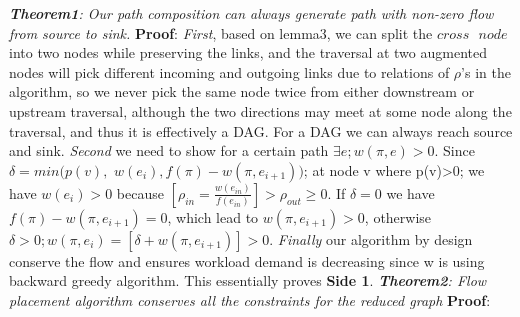 \documentclass{sig-alternate}
\begin{document}
\newline\newline
\textit{\textbf{Theorem1}: Our path composition can always generate path with non-zero flow from source to sink. }
\newline
\textbf{Proof}: 
\newline
\textit{First}, based on lemma3, we can split the $cross\text{ } node$ into two nodes while preserving the links, and the traversal at two augmented nodes will pick different incoming and outgoing links due to relations of $\rho$'s  in the algorithm, so we never pick the same node twice from either downstream or upstream traversal, although the two directions may meet at some node along the traversal, and thus it is effectively a DAG. For a DAG we can always reach source and sink.\newline
\textit{Second} we need to show for a certain path $\exists e; w(\pi, e)>0$. Since $\delta = min( p(v),$ $w(e_{i}),f(\pi) -w(\pi,e_{i+1}))$; at node v where p(v)>0; we have $w(e_i)>0$ because $[\rho_{in} =\frac{ w(e_{in})}{f(e_{in})} ]>\rho_{out}\geq 0$. If $\delta=0$ we have $ f(\pi) -w(\pi,e_{i+1}) =0$, which lead to $ w(\pi, e_{i+1})>0$, otherwise $ \delta>0;w(\pi, e_i) = [ \delta+w(\pi, e_{i+1} )]>0$.\newline
\textit{Finally} our algorithm by design conserve the flow and ensures workload demand is decreasing since w is using backward greedy algorithm.
\newline
This essentially proves \textbf{Side 1}.
\newline\newline
\textit{\textbf{Theorem2}: Flow placement algorithm conserves all the constraints for the reduced graph }
\newline
\textbf{Proof}:
\end{document}

